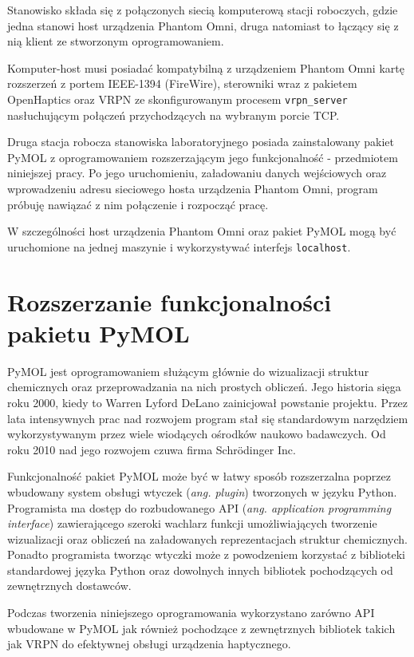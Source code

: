 \documentclass[licencjacka]{pracamgr}
\begin{document}
Stanowisko składa się z połączonych siecią komputerową stacji roboczych, gdzie jedna stanowi host urządzenia Phantom Omni, druga natomiast to łączący się z nią klient ze stworzonym oprogramowaniem. 

Komputer-host musi posiadać kompatybilną z urządzeniem Phantom Omni kartę rozszerzeń z portem IEEE-1394 (FireWire), sterowniki wraz z pakietem OpenHaptics oraz VRPN ze skonfigurowanym procesem \texttt{vrpn\_server} nasłuchującym połączeń przychodzących na wybranym porcie TCP. 

Druga stacja robocza stanowiska laboratoryjnego posiada zainstalowany pakiet PyMOL z oprogramowaniem rozszerzającym jego funkcjonalność - przedmiotem niniejszej pracy. Po jego uruchomieniu, załadowaniu danych wejściowych oraz wprowadzeniu adresu sieciowego hosta urządzenia Phantom Omni, program próbuję nawiązać z nim połączenie i rozpocząć pracę.

W szczególności host urządzenia Phantom Omni oraz pakiet PyMOL mogą być uruchomione na jednej maszynie i wykorzystywać interfejs \texttt{localhost}.

\section{Rozszerzanie funkcjonalności pakietu PyMOL}

PyMOL jest oprogramowaniem służącym głównie do wizualizacji struktur chemicznych oraz przeprowadzania na nich prostych obliczeń. Jego historia sięga roku 2000, kiedy to Warren Lyford DeLano zainicjował powstanie projektu. Przez lata intensywnych prac nad rozwojem program stał się standardowym narzędziem wykorzystywanym przez wiele wiodących ośrodków naukowo badawczych. Od roku 2010 nad jego rozwojem czuwa firma Schrödinger Inc.

Funkcjonalność pakiet PyMOL może być w łatwy sposób rozszerzalna poprzez wbudowany system obsługi wtyczek (\textit{ang. plugin}) tworzonych w języku Python. Programista ma dostęp do rozbudowanego API (\textit{ang. application programming interface}) zawierającego szeroki wachlarz funkcji umożliwiających tworzenie wizualizacji oraz obliczeń na załadowanych reprezentacjach struktur chemicznych. Ponadto programista tworząc wtyczki może z powodzeniem korzystać z biblioteki standardowej języka Python oraz dowolnych innych bibliotek pochodzących od zewnętrznych dostawców.

Podczas tworzenia niniejszego oprogramowania wykorzystano zarówno API wbudowane w PyMOL jak również pochodzące z zewnętrznych bibliotek takich jak VRPN do efektywnej obsługi urządzenia haptycznego.
\end{document}

